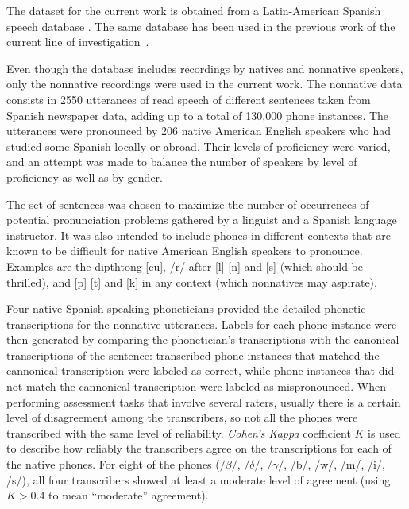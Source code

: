The dataset for the current work is obtained from a Latin-American Spanish speech database
\cite{database_collection}.  The same database has been used in the previous work of the
current line of \mbox{investigation \cite{main}}.

Even though the database includes recordings by natives and nonnative
speakers, only the nonnative recordings were used in the current work.
The nonnative data consists in 2550 utterances of read speech of different sentences
taken from Spanish newspaper data, adding up to
a total of 130,000 phone instances. The utterances were pronounced by 206 native American English
speakers who had studied some Spanish locally or abroad. Their levels of proficiency were varied,
and an attempt was made to balance the number of speakers by level of proficiency as well as by
gender.

The set of sentences was chosen to maximize the number of
occurrences of potential pronunciation problems gathered by a linguist and a Spanish language
instructor. It was also intended to include phones in different contexts that are known to be
difficult for native American English speakers to pronounce.
Examples are the dipthtong [eu], /r/ after [l] [n] and [s] (which should be
thrilled), and [p] [t] and [k] in any context (which nonnatives may aspirate).

Four native Spanish-speaking phoneticians provided the detailed phonetic transcriptions
for the nonnative utterances. Labels
for each phone instance were then generated by comparing the phonetician's transcriptions with
the canonical transcriptions of the sentence: transcribed phone instances that
matched the cannonical transcription were labeled as correct, while phone instances that did not
match the cannonical transcription were labeled as mispronounced. When performing assessment
tasks that involve several raters, usually there is a certain level of disagreement among the
transcribers, so not all the phones were transcribed with the same level of reliability.
\textit{Cohen's Kappa} coefficient $K$ \cite{kappa} is used to describe how reliably the
transcribers agree on the transcriptions for each of the native phones. For eight of the phones
($/\beta/$, $/\delta/$, $/\gamma/$, /b/, /w/, /m/, /i/, /s/), all four transcribers showed at least
a moderate level of agreement (using $K > 0.4$ to mean ``moderate'' agreement).

